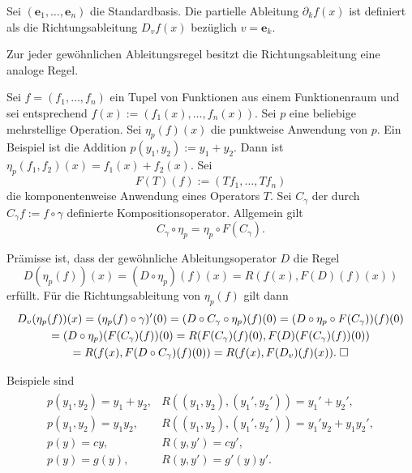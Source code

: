 \begin{Definition}%
\newlinefirst
Sei $(\mathbf e_1,\ldots,\mathbf e_n)$ die Standardbasis. 
Die partielle Ableitung $\partial_k f(x)$ ist definiert als
die Richtungsableitung $D_v f(x)$ bezüglich $v=\mathbf e_k$.
\end{Definition}

\begin{Satz}
Zur jeder gewöhnlichen Ableitungsregel besitzt die
Richtungsableitung eine analoge Regel.
\end{Satz}
Sei $f=(f_1,\ldots,f_n)$ ein Tupel von Funktionen aus einem
Funktionenraum und sei entsprechend
$f(x):=(f_1(x),\ldots, f_n(x))$. Sei $p$ eine beliebige mehrstellige
Operation. Sei $\eta_p(f)(x)$ die punktweise Anwendung von $p$.
Ein Beispiel ist die Addition $p(y_1,y_2):=y_1+y_2$. Dann ist
$\eta_p(f_1,f_2)(x)=f_1(x)+f_2(x)$. Sei%
\[F(T)(f) := (T f_1,\ldots ,T f_n)\]
die komponentenweise Anwendung eines Operators $T$.
Sei $C_\gamma$ der durch $C_\gamma f := f\circ\gamma$ definierte
Kompositionsoperator. Allgemein gilt%
\[C_\gamma\circ\eta_p = \eta_p\circ F(C_\gamma).\]

\begin{Beweis}
Prämisse ist, dass der gewöhnliche Ableitungsoperator $D$ die Regel
\[D(\eta_p(f))(x) = (D\circ\eta_p)(f)(x) = R(f(x),F(D)(f)(x))\]
erfüllt. Für die Richtungsableitung von $\eta_p(f)$ gilt dann
\begin{gather*}
D_v(\eta_p(f))(x) = (\eta_p(f)\circ\gamma)'(0)
= (D\circ C_\gamma\circ\eta_p)(f)(0)
= (D\circ\eta_p\circ F(C_\gamma))(f)(0)\\
= (D\circ\eta_p)(F(C_\gamma)(f))(0)
= R(F(C_\gamma)(f)(0),F(D)(F(C_\gamma)(f))(0))\\
= R(f(x),F(D\circ C_\gamma)(f)(0))
= R(f(x),F(D_v)(f)(x)).\;\square
\end{gather*}
\end{Beweis}

\noindent
Beispiele sind
\begin{gather*}
\begin{array}{ll}
p(y_1,y_2) = y_1+y_2, & R((y_1,y_2),(y_1',y_2')) = y_1'+y_2',\\[4pt]
p(y_1,y_2) = y_1 y_2, & R((y_1,y_2),(y_1',y_2')) = y_1'y_2 + y_1y_2',\\[4pt]
p(y) = cy, & R(y,y') = cy',\\[4pt]
p(y) = g(y), & R(y,y') = g'(y)y'.
\end{array}
\end{gather*}

